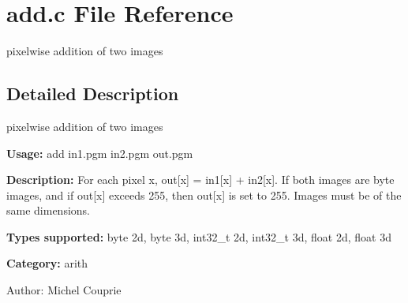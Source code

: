 \section{add.c File Reference}
\label{add_8c}
pixelwise addition of two images 



\subsection{Detailed Description}
pixelwise addition of two images 

{\bf Usage:} add in1.pgm in2.pgm out.pgm

{\bf Description:} For each pixel x, out[x] = in1[x] + in2[x]. If both images are byte images, and if out[x] exceeds 255, then out[x] is set to 255. Images must be of the same dimensions.

{\bf Types supported:} byte 2d, byte 3d, int32\_\-t 2d, int32\_\-t 3d, float 2d, float 3d

{\bf Category:} arith

\begin{Desc}
\item[Author:]Michel Couprie \end{Desc}
